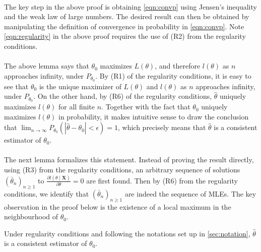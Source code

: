 $ $\\
The key step in the above proof is obtaining \cref{eqn:convp} using Jensen's inequality and the weak law of large numbers. The desired result can then be obtained by manipulating the definition of convergence in probability in \cref{eqn:convp}. Note \cref{eqn:regularity} in the above proof requires the use of (R2) from the regularity conditions.\\\\
The above lemma says that $\theta_0$ maximizes $L(\theta)$, and therefore $l(\theta)$ as $n$ approaches infinity, under $P_{\theta_0}$. By (R1) of the regularity conditions, it is easy to see that $\theta_0$ is the unique maximizer of $L(\theta)$ and $l(\theta)$ as $n$ approaches infinity, under $P_{\theta_0}$. On the other hand, by (R6) of the regularity conditions, $\hat{\theta}$ uniquely maximizes $l(\theta)$ for all finite $n$. Together with the fact that $\theta_0$ uniquely maximizes $l(\theta)$ in probability, it makes intuitive sense to draw the conclusion that $\lim_{n\to\infty}P_{\theta_0}\left(| \hat{\theta} - \theta_0 | < \epsilon \right) = 1$, which precisely means that $\hat{\theta}$ is a consistent estimator of $\theta_0$.\\\\
The next lemma formalizes this statement. Instead of proving the result directly, using (R3) from the regularity conditions, an arbitrary sequence of solutions $\left(\bar{\theta}_n\right)_{n\geq1}$ to $\frac{\partial l(\theta\mid \bm{X})}{\partial\theta}=0$ are first found. Then by (R6) from the regularity conditions, we identify that $\left(\bar{\theta}_n\right)_{n\geq1}$ are indeed the sequence of MLEs. The key observation in the proof below is the existence of a local maximum in the neighbourhood of $\theta_0$.
\begin{lemma}\label{lem:3}
Under regularity conditions and following the notations set up in \cref{sec:notation}, $\hat{\theta}$ is a consistent estimator of $\theta_0$.
\end{lemma}
